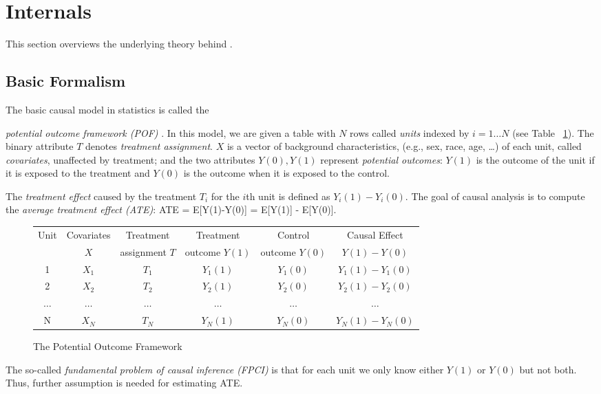 \section{Internals}

This section overviews the underlying theory behind \GSQL.

\subsection{Basic Formalism}

The basic causal model in statistics is called the
{\em potential outcome framework (POF)} \cite{Rubin2005,holland1986statistics}.
In this model, we are given a table with $N$ rows called {\em units} indexed by $i=1 \ldots N$ (see
Table~ \ref{fig:causal:inference}).  The binary attribute $T$ denotes {\em treatment assignment}.
$X$ is a vector of
background characteristics, (e.g., sex, race, age, \ldots) of each unit,
called {\em covariates}, unaffected by treatment; and the two
attributes $Y(0), Y(1)$ represent {\em potential outcomes}: $Y(1)$ is
the outcome of the unit if it is exposed to the treatment and $Y(0)$
is the outcome when it is exposed to the control.

The {\em treatment effect}
caused by the treatment $T_i$ for the $i$th unit  is defined as $Y_i(1)-Y_i(0)$.
The goal of causal analysis is to compute the {\em average treatment
  effect (ATE)}:   ATE = E[Y(1)-Y(0)] = E[Y(1)] - E[Y(0)].
\begin{figure}
  \centering
{\scriptsize
  \begin{tabular}{|c|c|c|c|c|c|} \hline
    Unit & Covariates & Treatment & Treatment & Control & Causal  Effect \\
   & $X$ & assignment $T$ & outcome $Y(1)$ & outcome $Y(0)$ & $Y(1)-Y(0)$ \\
    \hline
    1 & $X_1$ & $T_1$ & $Y_1(1)$ & $Y_1(0)$ & $Y_1(1) - Y_1(0)$ \\
    2 & $X_2$ & $T_2$ & $Y_2(1)$ & $Y_2(0)$ & $Y_2(1) - Y_2(0)$ \\
    $\ldots$ & $\ldots$ & $\ldots$ & $\ldots$ & $\ldots$ & $\ldots$ \\
    N & $X_N$ & $T_N$ & $Y_N(1)$ & $Y_N(0)$ & $Y_N(1) - Y_N(0)$ \\ \hline
  \end{tabular}
}
\caption{The Potential Outcome Framework~\cite{Rubin2005}}
  \label{fig:causal:inference}
  \vspace{-3mm}
\end{figure}
\noindent
The so-called {\em fundamental problem of causal inference (FPCI)} is that
for each unit we only know either $Y(1)$ or $Y(0)$ but not both.
Thus, further assumption is needed for estimating ATE. 


